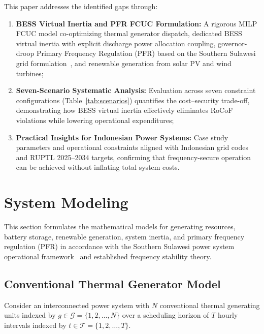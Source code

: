 \documentclass[journal]{IEEEtran}
\begin{document}
This paper addresses the identified gaps through:
\begin{enumerate}
  \item \textbf{BESS Virtual Inertia and PFR FCUC Formulation:}
    A rigorous MILP FCUC model co-optimizing thermal generator dispatch,
    dedicated BESS virtual inertia with explicit discharge power
    allocation coupling, governor-droop Primary Frequency Regulation
    (PFR) based on the Southern Sulawesi grid formulation~\cite{E02Sulawesi},
    and renewable generation from solar PV and wind turbines;

  \item \textbf{Seven-Scenario Systematic Analysis:} Evaluation across
    seven constraint configurations (Table~\ref{tab:scenarios})
    quantifies the cost--security trade-off, demonstrating how BESS
    virtual inertia effectively eliminates RoCoF violations while
    lowering operational expenditures;

  \item \textbf{Practical Insights for Indonesian Power Systems:}
    Case study parameters and operational constraints aligned with
    Indonesian grid codes and RUPTL 2025--2034 targets, confirming that
    frequency-secure operation can be achieved without inflating total
    system costs.
\end{enumerate}

\section{System Modeling}
\label{sec:model}

This section formulates the mathematical models for generating resources, battery storage, renewable generation, system inertia, and primary frequency regulation (PFR) in accordance with the Southern Sulawesi power system operational framework~\cite{E02Sulawesi} and established frequency stability theory.

\subsection{Conventional Thermal Generator Model}

Consider an interconnected power system with $N$ conventional thermal generating units indexed by $g \in \mathcal{G} = \{1, 2, \dots, N\}$ over a scheduling horizon of $T$ hourly intervals indexed by $t \in \mathcal{T} = \{1, 2, \dots, T\}$. 
\end{document}
